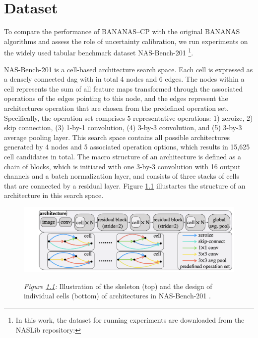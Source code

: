 \chapter{Dataset}
\label{dataset}
To compare the performance of BANANAS--CP with the original BANANAS algorithms and assess the role of uncertainty calibration, we run experiments on the widely used tabular benchmark dataset NAS-Bench-201 \cite{dong2020nasbench201} \footnote{In this work, the dataset for running experiments are downloaded from the NASLib repository: }.

NAS-Bench-201 is a cell-based architecture search space. Each cell is expressed as a densely connected \gls{dag} with in total 4 nodes and 6 edges. The nodes within a cell represents the sum of all feature maps transformed through the associated operations of the edges pointing to this node, and the edges represent the architectures operation that are chosen from the predefined operation set. Specifically, the operation set comprises 5 representative operations: 1) zeroize, 2) skip connection, (3) 1-by-1 convolution, (4) 3-by-3 convolution, and (5) 3-by-3 average pooling layer. This search space contains all possible architectures generated by 4 nodes and 5 associated operation options, which results in 15,625 cell candidates in total. The macro structure of an architecture is defined as a chain of blocks, which is initiated with one 3-by-3 convolution with 16 output channels and a batch normalization layer, and consists of three stacks of cells that are connected by a residual layer. Figure \ref{fig: nasbench201} illustartes the structure of an architecture in this search space.  
 		
	\begin{figure}[bthp]
		\centering
		\includegraphics[scale=0.45]{figs/nas_bench_201.png}
		\label{fig: nasbench201}
			\parbox{\linewidth}{
	 		\vspace{0.5em}
 	 		{\small \textit{Figure \ref{fig: nasbench201}:} Illustration of the skeleton (top) and the design of individual cells (bottom) of architectures in NAS-Bench-201 \cite{dong2020nasbench201}.
 	 		}
 		}
		\end{figure}

